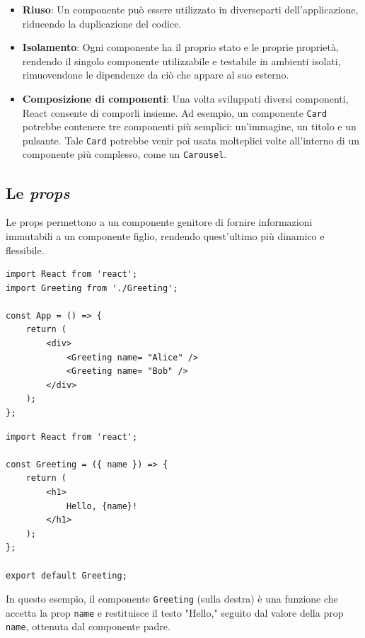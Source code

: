 \documentclass[target=bach,aauheader=,style=]{thud}
\begin{document}
\begin{itemize}
    \item \textbf{Riuso}: Un componente può essere utilizzato in diverseparti dell'applicazione, riducendo la duplicazione del codice.
    \item \textbf{Isolamento}: Ogni componente ha il proprio stato e le proprie proprietà, rendendo il singolo componente utilizzabile e testabile in ambienti isolati, rimuovendone le dipendenze da ciò che appare al suo esterno.
    \item \textbf{Composizione di componenti}: Una volta sviluppati diversi componenti, React consente di comporli insieme. Ad esempio, un componente \texttt{Card} potrebbe contenere tre componenti più semplici: un'immagine, un titolo e un pulsante. Tale \texttt{Card} potrebbe venir poi usata molteplici volte all'interno di un componente più complesso, come un \texttt{Carousel}.
\end{itemize}

\subsection{Le \textit{props}}
Le props permettono a un componente genitore di fornire informazioni immutabili a un componente figlio, rendendo quest'ultimo più dinamico e flessibile.

\begin{minipage}[t]{0.45\textwidth}
    \begin{lstlisting}[caption=Componente padre]
import React from 'react';
import Greeting from './Greeting';

const App = () => {
    return (
        <div>
            <Greeting name= "Alice" />
            <Greeting name= "Bob" />
        </div>
    );
};  
    \end{lstlisting}
\end{minipage}
\hfill
\begin{minipage}[t]{0.45\textwidth}
    \begin{lstlisting}[caption=Componente figlio]
import React from 'react';

const Greeting = ({ name }) => {
    return (
        <h1>
            Hello, {name}!
        </h1>
    );
};

export default Greeting;
    \end{lstlisting}
\end{minipage}

\noindent In questo esempio, il componente \texttt{Greeting} (sulla destra) è una funzione che accetta la prop \texttt{name} e restituisce il testo  "Hello," seguito dal valore della prop \texttt{name}, ottenuta dal componente padre. 
\end{document}
